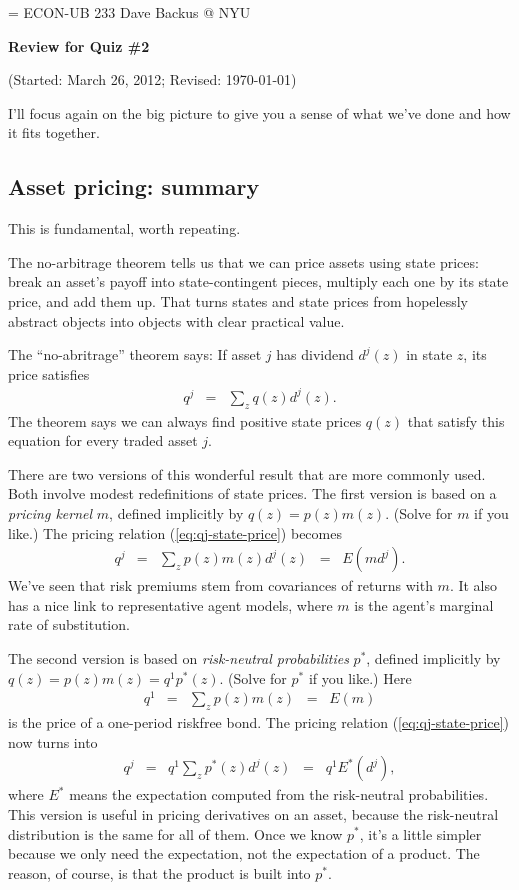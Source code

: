 \documentclass[11pt]{article}
\begin{document}
\parskip=\bigskipamount
\parindent=0.0in
\thispagestyle{empty}
{\large ECON-UB 233 \hfill Dave Backus @ NYU}

\bigskip\bigskip
\centerline{\Large \bf Review for Quiz \#2}
\centerline{(Started: March 26, 2012; Revised: \today)}

\bigskip
I'll focus again on the big picture to give you a sense of
what we've done and how it fits together.


\subsection*{Asset pricing:  summary}

This is fundamental, worth repeating.

The no-arbitrage theorem tells us that we can price
assets using state prices:
break an asset's payoff into state-contingent pieces,
multiply each one by its state price, and add them up.
That turns states and state prices from hopelessly abstract objects
into objects with clear practical value.

The ``no-abritrage'' theorem says:
If asset $j$ has dividend $d^j(z)$ in state $z$, its price satisfies
\begin{eqnarray}
    q^j &=& \sum_z q(z) d^j(z) .
    \label{eq:qj-state-price}
\end{eqnarray}
The theorem says we can always find positive state prices $q(z)$ that satisfy this
equation for every traded asset $j$.

There are two versions of this wonderful result that are more commonly used.
Both involve modest redefinitions of state prices.
The first version is based on a {\it pricing kernel\/} $m$,
defined implicitly by $ q(z) = p(z) m(z)$.
(Solve for $m$ if you like.)
The pricing relation (\ref{eq:qj-state-price}) becomes
\begin{eqnarray}
    q^j &=& \sum_z p(z) m(z) d^j(z) \;\;=\;\; E (m d^j) .
    \label{eq:q=Emd}
\end{eqnarray}
We've seen that risk premiums stem from covariances of returns with $m$.
It also has a nice link to representative agent models,
where $m$ is the agent's marginal rate of substitution.

The second version is based on
{\it risk-neutral probabilities\/} $p^*$,
defined implicitly by $ q(z) = p(z) m(z) = q^1 p^*(z)$.
(Solve for $p^*$ if you like.)
Here
\begin{eqnarray*}
    q^1 &=& \sum_z p(z) m(z) \;\;=\;\; E(m)
\end{eqnarray*}
is the price of a one-period riskfree bond.
The pricing relation (\ref{eq:qj-state-price}) now turns into
\begin{eqnarray}
    q^j &=& q^1 \sum_z p^*(z) d^j(z)  \;\;=\;\; q^1 E^* (d^j) ,
    \label{eq:q=Estar-d}
\end{eqnarray}
where $E^*$ means the expectation computed from the risk-neutral probabilities.
This version is useful in pricing derivatives on an asset,
because the risk-neutral distribution is the same for all of them.
Once we know $p^*$, it's a little simpler because we only need the
expectation, not the expectation of a product.
The reason, of course, is that the product is built into $p^*$.
\end{document}
